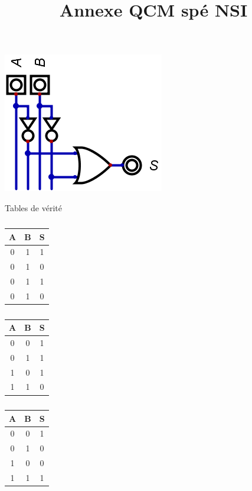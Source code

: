 \documentclass[11pt,a4paper]{article}
\title{Annexe QCM spé NSI}
\begin{document}
\maketitle
\begin{minipage}{\linewidth}
	\centering
	\includegraphics[scale=0.5]{Q4.png}
\end{minipage}

\begin{table}[!htb]
    \caption*{Tables de vérité}
    \begin{minipage}{.33\linewidth}
      \caption{}
      \centering
        \begin{tabular}{|c|c|c|}
		\hline 
		A & B & S \\ 
		\hline 
		0 & 1 & 1 \\ 
		\hline 
		0 & 1 & 0 \\ 
		\hline 
		0 & 1 & 1 \\ 
		\hline 
		0 & 1 & 0 \\ 
		\hline 
		\end{tabular} 
    \end{minipage}%
    \begin{minipage}{.33\linewidth}
      \centering
        \caption{}
        \begin{tabular}{|c|c|c|}
		\hline 
		A & B & S \\ 
		\hline 
		0 & 0 & 1 \\ 
		\hline 
		0 & 1 & 1 \\ 
		\hline 
		1 & 0 & 1 \\ 
		\hline 
		1 & 1 & 0 \\ 
		\hline 
		\end{tabular} 
    \end{minipage}
    \begin{minipage}{.33\linewidth}
      \centering
        \caption{}
        \begin{tabular}{|c|c|c|}
		\hline 
		A & B & S \\ 
		\hline 
		0 & 0 & 1 \\ 
		\hline 
		0 & 1 & 0 \\ 
		\hline 
		1 & 0 & 0 \\ 
		\hline 
		1 & 1 & 1 \\ 
		\hline 
		\end{tabular} 
    \end{minipage}  
\end{table}
\end{document}
